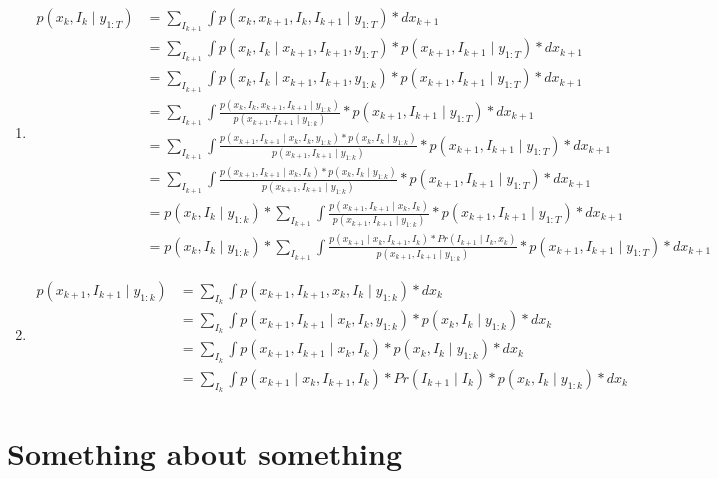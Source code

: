 \documentclass[times, twoside, watermark]{zHenriquesLab-StyleBioRxiv}
\begin{document}
\begin{enumerate}
\item
$$
\begin{align*}
p(x_{k}, I_{k} \mid y_{1:T}) &= \sum_{I_{k+1}} \int p(x_{k}, x_{k+1}, I_{k}, I_{k+1} \mid y_{1:T}) * dx_{k+1}
\\ &= \sum_{I_{k+1}} \int p(x_{k}, I_{k} \mid x_{k+1}, I_{k+1}, y_{1:T}) * p(x_{k+1}, I_{k+1} \mid y_{1:T}) * dx_{k+1}
\\ &= \sum_{I_{k+1}} \int p(x_{k}, I_{k} \mid x_{k+1}, I_{k+1}, y_{1:k}) * p(x_{k+1}, I_{k+1} \mid y_{1:T}) * dx_{k+1}
\\ &= \sum_{I_{k+1}} \int \frac{p(x_{k}, I_{k}, x_{k+1}, I_{k+1} \mid y_{1:k})}{p(x_{k+1}, I_{k+1} \mid y_{1:k})} * p(x_{k+1}, I_{k+1} \mid y_{1:T}) * dx_{k+1}
\\ &= \sum_{I_{k+1}} \int \frac{p(x_{k+1}, I_{k+1} \mid x_{k}, I_{k}, y_{1:k}) * p(x_{k}, I_{k} \mid y_{1:k})}{p(x_{k+1}, I_{k+1} \mid y_{1:k})} * p(x_{k+1}, I_{k+1} \mid y_{1:T}) * dx_{k+1} 
\\ &= \sum_{I_{k+1}} \int \frac{p(x_{k+1}, I_{k+1} \mid x_{k}, I_{k}) * p(x_{k}, I_{k} \mid y_{1:k})}{p(x_{k+1}, I_{k+1} \mid y_{1:k})} * p(x_{k+1}, I_{k+1} \mid y_{1:T}) * dx_{k+1}
\\ &= p(x_{k}, I_{k} \mid y_{1:k}) * \sum_{I_{k+1}} \int \frac{p(x_{k+1}, I_{k+1} \mid x_{k}, I_{k})}{p(x_{k+1}, I_{k+1} \mid y_{1:k})} * p(x_{k+1}, I_{k+1} \mid y_{1:T}) * dx_{k+1} 
\\ &= p(x_{k}, I_{k} \mid y_{1:k}) * \sum_{I_{k+1}} \int \frac{p(x_{k+1} \mid x_{k}, I_{k+1}, I_{k}) * Pr(I_{k+1} \mid I_{k}, x_{k})}{p(x_{k+1}, I_{k+1} \mid y_{1:k})} * p(x_{k+1}, I_{k+1} \mid y_{1:T}) * dx_{k+1}
\end{align*}$$

\item
$$
\begin{align*}
p(x_{k+1}, I_{k+1} \mid y_{1:k}) &= \sum_{I_{k}} \int p(x_{k+1}, I_{k+1}, x_{k}, I_{k} \mid y_{1:k}) * dx_{k}
\\ &= \sum_{I_{k}} \int p(x_{k+1}, I_{k+1} \mid x_{k}, I_{k}, y_{1:k}) * p(x_{k}, I_{k} \mid y_{1:k}) * dx_{k}
\\ &= \sum_{I_{k}} \int p(x_{k+1}, I_{k+1} \mid x_{k}, I_{k}) * p(x_{k}, I_{k} \mid y_{1:k}) * dx_{k}
\\ &= \sum_{I_{k}} \int p(x_{k+1} \mid x_{k}, I_{k+1}, I_{k}) * Pr(I_{k+1} \mid I_{k}) * p(x_{k}, I_{k} \mid y_{1:k}) * dx_{k}
\end{align*}$$

\end{enumerate}

\newpage

\captionsetup*{format=largeformat}
\section{Something about something} \label{note:Note1} 
\Blindtext

\end{document}
